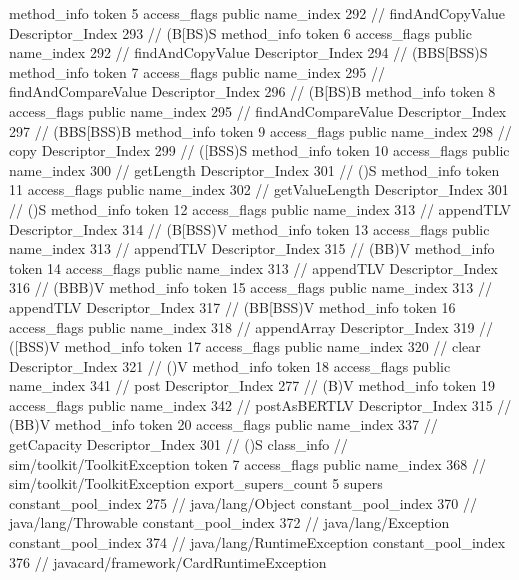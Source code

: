 {{{{{				}
				method_info {
					token	5
					access_flags	public
					name_index	292		// findAndCopyValue
					Descriptor_Index	293		// (B[BS)S
				}
				method_info {
					token	6
					access_flags	public
					name_index	292		// findAndCopyValue
					Descriptor_Index	294		// (BBS[BSS)S
				}
				method_info {
					token	7
					access_flags	public
					name_index	295		// findAndCompareValue
					Descriptor_Index	296		// (B[BS)B
				}
				method_info {
					token	8
					access_flags	public
					name_index	295		// findAndCompareValue
					Descriptor_Index	297		// (BBS[BSS)B
				}
				method_info {
					token	9
					access_flags	public
					name_index	298		// copy
					Descriptor_Index	299		// ([BSS)S
				}
				method_info {
					token	10
					access_flags	public
					name_index	300		// getLength
					Descriptor_Index	301		// ()S
				}
				method_info {
					token	11
					access_flags	public
					name_index	302		// getValueLength
					Descriptor_Index	301		// ()S
				}
				method_info {
					token	12
					access_flags	public
					name_index	313		// appendTLV
					Descriptor_Index	314		// (B[BSS)V
				}
				method_info {
					token	13
					access_flags	public
					name_index	313		// appendTLV
					Descriptor_Index	315		// (BB)V
				}
				method_info {
					token	14
					access_flags	public
					name_index	313		// appendTLV
					Descriptor_Index	316		// (BBB)V
				}
				method_info {
					token	15
					access_flags	public
					name_index	313		// appendTLV
					Descriptor_Index	317		// (BB[BSS)V
				}
				method_info {
					token	16
					access_flags	public
					name_index	318		// appendArray
					Descriptor_Index	319		// ([BSS)V
				}
				method_info {
					token	17
					access_flags	public
					name_index	320		// clear
					Descriptor_Index	321		// ()V
				}
				method_info {
					token	18
					access_flags	public
					name_index	341		// post
					Descriptor_Index	277		// (B)V
				}
				method_info {
					token	19
					access_flags	public
					name_index	342		// postAsBERTLV
					Descriptor_Index	315		// (BB)V
				}
				method_info {
					token	20
					access_flags	public
					name_index	337		// getCapacity
					Descriptor_Index	301		// ()S
				}
			}
		}
		class_info {		// sim/toolkit/ToolkitException
			token	7
			access_flags	public
			name_index	368		// sim/toolkit/ToolkitException
			export_supers_count	5
			supers {
				constant_pool_index	275		// java/lang/Object
				constant_pool_index	370		// java/lang/Throwable
				constant_pool_index	372		// java/lang/Exception
				constant_pool_index	374		// java/lang/RuntimeException
				constant_pool_index	376		// javacard/framework/CardRuntimeException
}}}}
